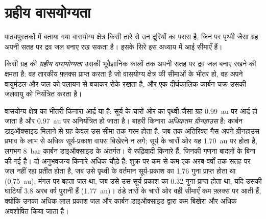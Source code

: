 \section{ग्रहीय वासयोग्यता}\label{sec:b3:planetary-atmospheres:habitability}

पाठ्यपुस्तकों में बताया गया वासयोग्य क्षेत्र किसी तारे से उन दूरियों का परास है,
जिन पर पृथ्वी जैसा ग्रह अपनी
सतह पर द्रव जल बनाए रख सकता है। इसके सिरे इस अध्याय में आई सीमाएँ हैं।

\begin{definition}[ग्रहीय वासयोग्यता]\label{def:b3:planetary-atmospheres:habitability}
किसी ग्रह की \emph{ग्रहीय वासयोग्यता} उसकी
भूवैज्ञानिक कालों तक अपनी सतह पर द्रव जल बनाए रखने की क्षमता है:
वह तारकीय फ़्लक्स प्राप्त करता है जो वासयोग्य क्षेत्र की सीमाओं के भीतर हो,
वह अपने वायुमंडल और जल को पलायन से बचाकर रोके रखता है,
और एक दीर्घकालिक कार्बन चक्र उसकी जलवायु को नियंत्रित करता है।
\end{definition}

वासयोग्य क्षेत्र का भीतरी किनारा आर्द्र या  है: सूर्य के चारों ओर का पृथ्वी-जैसा ग्रह \qty{0.99}{au} पर
आर्द्र हो जाता है और \qty{0.97}{au} पर अनियंत्रित हो जाता है। बाहरी किनारा
\emph{अधिकतम ग्रीनहाउस} है: कार्बन डाइऑक्साइड मिलाने से ग्रह केवल उस सीमा तक गरम होता है,
जब तक अतिरिक्त गैस अपने ग्रीनहाउस प्रभाव के लाभ से अधिक सूर्य-प्रकाश वापस बिखेरने न लगे;
सूर्य के चारों ओर यह
\qty{1.70}{au} पर होता है, लगभग \qty{8}{bar} कार्बन डाइऑक्साइड के अंतर्गत।
ये रूढ़िवादी किनारे हैं, जिनकी गणना बादलों के बिना की गई है। दो अनुभवजन्य किनारे अधिक चौड़े हैं:
शुक्र पर कम से कम एक अरब वर्षों तक सतह पर जल नहीं रहा प्रतीत होता है,
जब उसे पृथ्वी के वर्तमान सूर्य-प्रकाश का 1.76 गुना प्राप्त होता था (\qty{0.75}{au});
मंगल पर बहता जल था, जब उसे उस सूर्य-प्रकाश का 0.32 गुना प्राप्त होता था, यदि उसकी
घाटियाँ 3.8 अरब वर्ष पुरानी हैं (\qty{1.77}{au})। ठंडे तारों के चारों ओर वही सीमाएँ
कम फ़्लक्स पर आती हैं, क्योंकि उनका अधिक लाल प्रकाश
जल और कार्बन डाइऑक्साइड द्वारा कम बिखेरा और अधिक अवशोषित किया जाता है।


